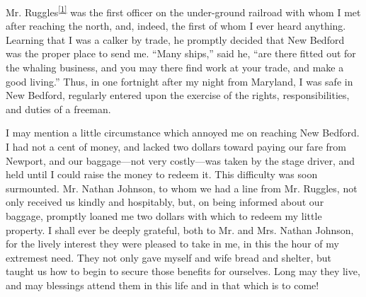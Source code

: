 Mr. Ruggles\textsuperscript{\protect\hyperlink{cite_note-1}{{[}1{]}}}
was the first officer on the under-ground railroad with whom I met after
reaching the north, and, indeed, the first of whom I ever heard
anything. Learning that I was a calker by trade, he promptly decided
that New Bedford was the proper place to send me. ``Many ships,'' said
he, ``are there fitted out for the whaling business, and you may there
find work at your trade, and make a good living.'' Thus, in one
fortnight after my night from Maryland, I was safe in New Bedford,
regularly entered upon the exercise of the rights, responsibilities, and
duties of a freeman.

I may mention a little circumstance which annoyed me on reaching New
Bedford. I had not a cent of money, and lacked two dollars toward paying
our fare from Newport, and our baggage---not very {}costly---was taken
by the stage driver, and held until I could raise the money to redeem
it. This difficulty was soon surmounted. Mr. Nathan Johnson, to whom we
had a line from Mr. Ruggles, not only received us kindly and hospitably,
but, on being informed about our baggage, promptly loaned me two dollars
with which to redeem my little property. I shall ever be deeply
grateful, both to Mr. and Mrs. Nathan Johnson, for the lively interest
they were pleased to take in me, in this the hour of my extremest need.
They not only gave myself and wife bread and shelter, but taught us how
to begin to secure those benefits for ourselves. Long may they live, and
may blessings attend them in this life and in that which is to come!

